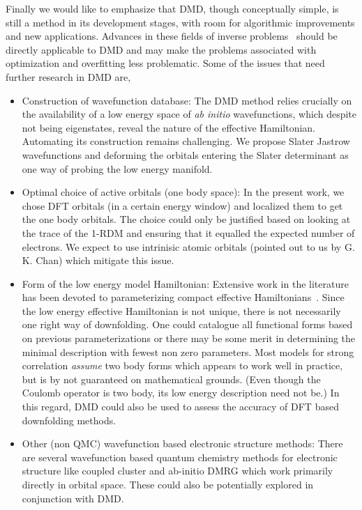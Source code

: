 Finally we would like to emphasize that DMD, though conceptually simple, 
is still a method in its development stages, with room for algorithmic improvements and new applications. 
Advances in these fields of inverse problems~\cite{Berg2017} should be directly applicable to DMD and 
may make the problems associated with optimization and overfitting less problematic. Some of the issues that need further research 
in DMD are,
\begin{itemize} 
	\item Construction of wavefunction database:
	The DMD method relies crucially on the availability of a low energy space of \emph{ab initio} wavefunctions, 
	which despite not being eigenstates, reveal the nature of the effective Hamiltonian. Automating its construction 
	remains challenging. We propose Slater Jastrow wavefunctions and deforming the orbitals entering the Slater 
	determinant as one way of probing the low energy manifold.
	\item Optimal choice of active orbitals (one body space):
	In the present work, we chose DFT orbitals (in a certain energy window) and localized them to get the one body orbitals. 
	The choice could only be justified based on looking at the trace of the 1-RDM and ensuring that it 
	equalled the expected number of electrons. We expect to use intrinisic atomic orbitals (pointed out to us by G. K. Chan) which 
	mitigate this issue. 
	\item Form of the low energy model Hamiltonian:
	Extensive work in the literature has been devoted to parameterizing compact effective Hamiltonians~\cite{Georges, Oles, Coury}. 
	Since the low energy effective Hamiltonian is not unique, there is not necessarily one right way of downfolding. 
	One could catalogue all functional forms based on previous parameterizations 
	or there may be some merit in determining the minimal description with fewest non zero parameters.
	Most models for strong correlation \textit{assume} two body forms which appears to work well in practice, 
	but is by not guaranteed on mathematical grounds. (Even though the Coulomb operator is two body, 
	its low energy description need not be.) In this regard, DMD could also be used to assess 
	the accuracy of DFT based downfolding methods.
	\item Other (non QMC) wavefunction based electronic structure methods:
	There are several wavefunction based quantum chemistry 
	methods for electronic structure like coupled cluster and ab-initio DMRG which work primarily 
	directly in orbital space. These could also be potentially explored in conjunction with DMD.
\end{itemize} 


